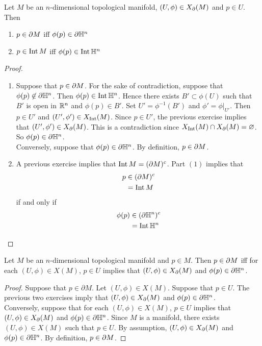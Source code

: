 \documentclass{book}
\begin{document}
	\begin{ex}
		Let $M$ be an $n$-dimensional topological manifold, $(U, \phi) \in X_{\partial}(M)$ and $p \in U$. Then 
		\begin{enumerate}
			\item $p \in \partial M$ iff $\phi(p) \in \partial \mathbb{H}^n$
			\item $p \in \operatorname{Int} M$ iff $\phi(p) \in \operatorname{Int} \mathbb{H}^n$
		\end{enumerate}
	\end{ex}

	\begin{proof}\
		\begin{enumerate}
			\item Suppose that $p \in \partial M$. For the sake of contradiction, suppose that $\phi(p) \not \in \partial \mathbb{H}^n$. Then $\phi(p) \in \operatorname{Int} \mathbb{H}^n$. Hence there exists $B' \subset \phi(U)$ such that $B'$ is open in $\mathbb{R}^n$ and $\phi(p) \in B'$. Set $U' = \phi^{-1}(B')$ and $\phi' = \phi|_{U'}$. Then $p \in U'$ and $(U', \phi') \in X_{\operatorname{Int}}(M)$. Since $p \in U'$, the previous exercise implies that $(U', \phi') \in X_{\partial}(M)$. This is a contradiction since $X_{\operatorname{Int}}(M) \cap X_{\partial}(M) = \varnothing$. So $\phi(p) \in \partial \mathbb{H}^n$.\\
			Conversely, suppose that $\phi(p) \in \partial \mathbb{H}^n$. By definition, $p \in \partial M$.
			\item A previous exercise implies that $\operatorname{Int} M = (\partial M)^c$. Part $(1)$ implies that 
			\begin{align*}
				p
				& \in (\partial M)^c \\
				& = \operatorname{Int} M
			\end{align*}
			if and only if
			\begin{align*}
				\phi(p)
				& \in (\partial \mathbb{H}^n)^c \\
				& = \operatorname{Int} \mathbb{H}^n
			\end{align*}
		\end{enumerate}
	\end{proof}

	\begin{ex}
		Let $M$ be an $n$-dimensional topological manifold and $p \in M$. Then $p \in \partial M$ iff for each $(U, \phi) \in X(M)$, $p \in U$ implies that $(U, \phi) \in X_{\partial}(M)$ and $\phi(p) \in \partial \mathbb{H}^n$. \\
	\end{ex}

	\begin{proof}
		Suppose that $p \in \partial M$. Let $(U, \phi) \in X(M)$. Suppose that $p \in U$. The previous two exercises imply that $(U, \phi) \in X_{\partial}(M)$ and $\phi(p) \in \partial \mathbb{H}^n$.\\
		Conversely, suppose that for each $(U, \phi) \in X(M)$, $p \in U$ implies that $(U, \phi) \in X_{\partial}(M)$ and $\phi(p) \in \partial \mathbb{H}^n$. Since $M$ is a manifold, there exists $(U, \phi) \in X(M)$ such that $p \in U$. By assumption, $(U, \phi) \in X_{\partial}(M)$ and $\phi(p) \in \partial \mathbb{H}^n$. By definition, $p \in \partial M$.
	\end{proof} 
	
\end{document}
